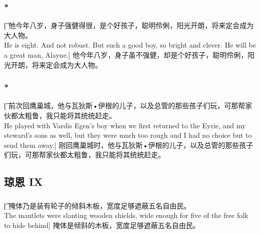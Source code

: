 \documentclass[12pt,a4paper]{article}
\begin{document}
\subsubsection{\color{red}*}\t[
	他今年八岁，身子强健得很，是个好孩子，聪明伶俐，阳光开朗，将来定会成为大人物。\\
	He is eight. And not robust. But such a good boy, so bright and clever. He will be a great man, Alayne.]
	他今年八岁，身子虽不强健，却是个好孩子，聪明伶俐，阳光开朗，将来定会成为大人物。
	
\subsubsection{\color{red}*}\t[
	前次回鹰巢城，他与瓦狄斯•伊根的儿子，以及总管的那些孩子们玩，可那帮家伙都太粗鲁，我只能将其统统赶走。\\
	He played with Vardis Egen's boy when we first returned to the Eyrie, and my steward's sons as well, but they were much too rough and I had no choice but to send them away.]
	刚回鹰巢城时，他与瓦狄斯•伊根的儿子，以及总管的那些孩子们玩，可那帮家伙都太粗鲁，我只能将其统统赶走。
		
\subsection{琼恩 IX}
\subsubsection{}\t[
	掩体乃是装有轮子的倾斜木板，宽度足够遮蔽五名自由民。\\
	The mantlets were slanting wooden shields, wide enough for five of the free folk to hide behind]
	掩体是倾斜的木板，宽度足够遮蔽五名自由民。
\end{document}
